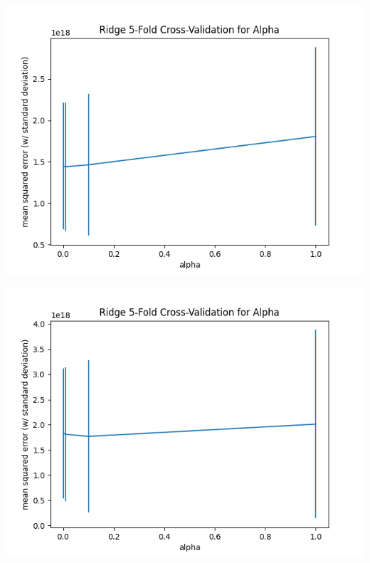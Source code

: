 \documentclass[10pt]{article}
\begin{document}
		\begin{minipage}{0.9\linewidth}
			\begin{minipage}{0.35\linewidth}
				\includegraphics[width=\linewidth]{../graphs/stasis_webifier_ridge_alpha_crossval.png}
			\end{minipage}%
			\begin{minipage}{0.35\linewidth}
				\includegraphics[width=\linewidth]{../graphs/shield_booster_ridge_alpha_crossval.png}
			\end{minipage}
			

\end{minipage}
\end{document}
